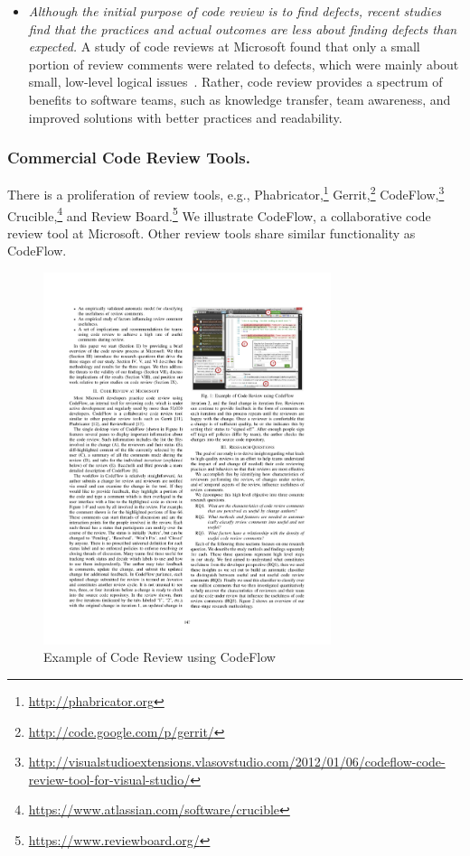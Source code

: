 \begin{itemize}
\item {\it Although the initial purpose of code review is to find defects, recent studies find that the practices and actual outcomes are less about finding defects than expected.} A study of code reviews at Microsoft found that only a small portion of review comments were related to defects, which were mainly about small, low-level logical issues~\cite{bacchelli2013expectations}. Rather, code review provides a spectrum of benefits to software teams, such as knowledge transfer, team awareness, and improved solutions with better practices and readability. 

\end{itemize} 

\subsubsection{Commercial Code Review Tools.} 
\label{sec:reviewtool} 

There is a proliferation of review tools, e.g., Phabricator,\footnote{\url{http://phabricator.org}} Gerrit,\footnote{\url{http://code.google.com/p/gerrit/}} CodeFlow,\footnote{\url{http://visualstudioextensions.vlasovstudio.com/2012/01/06/codeflow-code-review-tool-for-visual-studio/}} Crucible,\footnote{\url{https://www.atlassian.com/software/crucible}} and Review Board.\footnote{\url{https://www.reviewboard.org/}} We illustrate CodeFlow, a collaborative code review tool at Microsoft. Other review tools share similar functionality as CodeFlow.

\begin{figure}[ht]
 \centering
 \includegraphics[width=0.75\textwidth]{images/codeflow.pdf}
 \caption{Example of Code Review using CodeFlow~\cite{bosu2015characteristics}}
 \label{fig:codeflow}
\end{figure}

